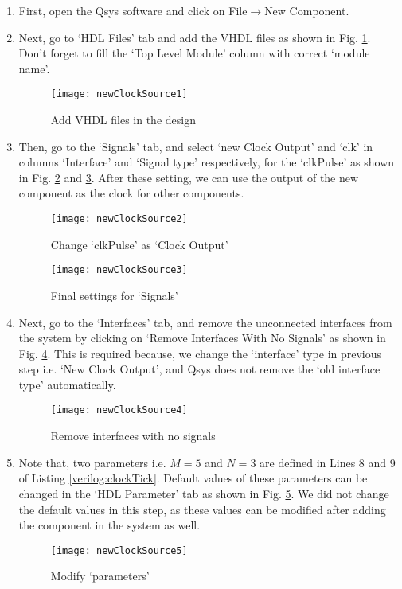 \begin{enumerate}
	\item First, open the Qsys software and click on File$\rightarrow$New Component.
	\item Next, go to `HDL Files' tab and add the VHDL files as shown in Fig. \ref{fig:newClockSource1}. Don't forget to fill the `Top Level Module' column with correct `module name'.
	\begin{figure}[!h]
		\centering
		\texttt{[image: newClockSource1]}
		\caption{Add VHDL files in the design}
		\label{fig:newClockSource1}
	\end{figure}
	
	\item Then, go to the `Signals' tab, and select `new Clock Output' and `clk' in columns `Interface' and `Signal type' respectively, for the `clkPulse' as shown in Fig. \ref{fig:newClockSource2} and \ref{fig:newClockSource3}. After these setting, we can use the output of the new component as the clock for other components.
	
	\begin{figure}[!h]
		\centering
		\texttt{[image: newClockSource2]}
		\caption{Change `clkPulse' as `Clock Output'}
		\label{fig:newClockSource2}
	\end{figure}
	\begin{figure}[!h]
		\centering
		\texttt{[image: newClockSource3]}
		\caption{Final settings for `Signals'}
		\label{fig:newClockSource3}
	\end{figure} 
	
	\item Next, go to the `Interfaces' tab, and remove the unconnected interfaces from the system by clicking on `Remove Interfaces With No Signals' as shown in Fig. \ref{fig:newClockSource4}. This is required because, we change the `interface' type in previous step i.e. `New Clock Output', and Qsys does not remove the `old interface type' automatically.
	\begin{figure}[!h]
		\centering
		\texttt{[image: newClockSource4]}
		\caption{Remove interfaces with no signals}
		\label{fig:newClockSource4}
	\end{figure} 
	
	\item Note that, two parameters i.e. $M = 5$ and $N = 3$ are defined in Lines 8 and 9 of Listing \ref{verilog:clockTick}. Default values of these parameters can be changed in the `HDL Parameter' tab as shown in Fig. \ref{fig:newClockSource5}. We did not change the default values in this step, as these values can be modified after adding the component in the system as well.
	\begin{figure}[!h]
		\centering
		\texttt{[image: newClockSource5]}
		\caption{Modify `parameters'}
		\label{fig:newClockSource5}
	\end{figure} 
	

\end{enumerate}
